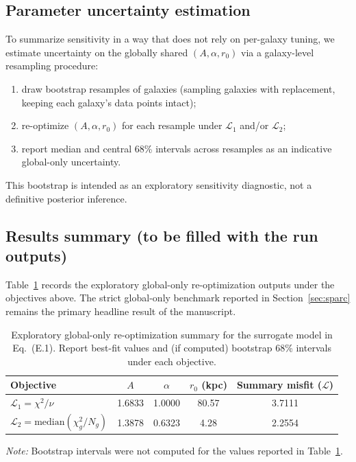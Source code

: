 \documentclass[entropy,article,submit,pdftex,moreauthors]{Definitions/mdpi}
\begin{document}
\subsection{Parameter uncertainty estimation}
To summarize sensitivity in a way that does not rely on per-galaxy tuning, we estimate uncertainty on
the globally shared \((A,\alpha,r_0)\) via a galaxy-level resampling procedure:
\begin{enumerate}[label=(\roman*), leftmargin=*]
\item draw bootstrap resamples of galaxies (sampling galaxies with replacement, keeping each galaxy's data points intact);
\item re-optimize \((A,\alpha,r_0)\) for each resample under \(\mathcal{L}_1\) and/or \(\mathcal{L}_2\);
\item report median and central 68\% intervals across resamples as an indicative global-only uncertainty.
\end{enumerate}
This bootstrap is intended as an exploratory sensitivity diagnostic, not a definitive posterior inference.

\subsection{Results summary (to be filled with the run outputs)}
Table~\ref{tab:reopt_results} records the exploratory global-only re-optimization outputs under the objectives above. The strict global-only benchmark reported in Section~\ref{sec:sparc} remains the primary headline result of the manuscript.

\begin{table}[H]
\caption{Exploratory global-only re-optimization summary for the surrogate model in
Eq.~(E.1). Report best-fit values and (if computed) bootstrap 68\% intervals under
each objective.}
\label{tab:reopt_results}
\centering
\begin{tabular}{lcccc}
\toprule
Objective & \(A\) & \(\alpha\) & \(r_0\) (kpc) & Summary misfit (\(\mathcal{L}\)) \\
\midrule
\(\mathcal{L}_1 = \chi^2/\nu\) &
1.6833 & 1.0000 & 80.57 & 3.7111 \\
\(\mathcal{L}_2 = \mathrm{median}(\chi^2_g/N_g)\) &
1.3878 & 0.6323 & 4.28 & 2.2554 \\
\bottomrule
\end{tabular}
\end{table}

\noindent\textit{Note:} Bootstrap intervals were not computed for the values reported in Table~\ref{tab:reopt_results}.
\end{document}

